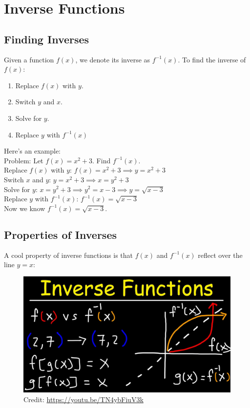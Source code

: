 \documentclass[12pt]{article}
\begin{document}
\section{Inverse Functions}

\subsection{Finding Inverses}
Given a function \(f(x)\), we denote its inverse as \(f^{-1}(x).\) To find the inverse of \(f(x)\):\\

\begin{enumerate}
  \item Replace \(f(x)\) with \(y\).
  \item Switch \(y\) and \(x\).
  \item Solve for \(y\).
  \item Replace \(y\) with \(f^{-1}(x)\)
\end{enumerate}

Here's an example:\\

Problem: Let \(f(x)=x^2+3\). Find \(f^{-1}(x)\).\\

Replace \(f(x)\) with \(y\): \(f(x)=x^2+3\implies y=x^2+3\)\\

Switch \(x\) and \(y\): \(y=x^2+3\implies x=y^2+3\)\\

Solve for \(y\): \(x=y^2+3\implies y^2=x-3 \implies y=\sqrt{x-3}\)\\

Replace \(y\) with \(f^{-1}(x)\): \(f^{-1}(x)=\sqrt{x-3}\)\\

Now we know \(f^{-1}(x)=\sqrt{x-3}\).\\

\subsection{Properties of Inverses}

A cool property of inverse functions is that \(f(x)\) and \(f^{-1}(x)\) reflect over the line \(y=x\):\\

\begin{figure}[H]
	\centering
	\includegraphics[scale=0.2]{inverse.jpg}
	\caption{Credit: \url{https://youtu.be/TN4ybFiuV3k}}
\end{figure}
\end{document}
